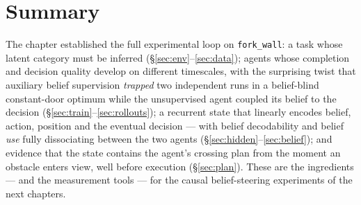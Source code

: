 \documentclass[11pt]{article}
\newcommand{\code}[1]{\texttt{#1}}
\begin{document}
\section{Summary}
The chapter established the full experimental loop on \code{fork\_wall}: a
task whose latent category must be inferred (\S\ref{sec:env}--\ref{sec:data});
agents whose completion and decision quality develop on different timescales,
with the surprising twist that auxiliary belief supervision \emph{trapped}
two independent runs in a belief-blind constant-door optimum while the
unsupervised agent coupled its belief to the decision
(\S\ref{sec:train}--\ref{sec:rollouts}); a recurrent state that linearly
encodes belief, action, position and the eventual decision --- with belief
decodability and belief \emph{use} fully dissociating between the two agents
(\S\ref{sec:hidden}--\ref{sec:belief}); and evidence that the state contains
the agent's crossing plan from the moment an obstacle enters view, well before
execution (\S\ref{sec:plan}). These are the ingredients --- and the
measurement tools --- for the causal belief-steering experiments of the next
chapters.
\end{document}

